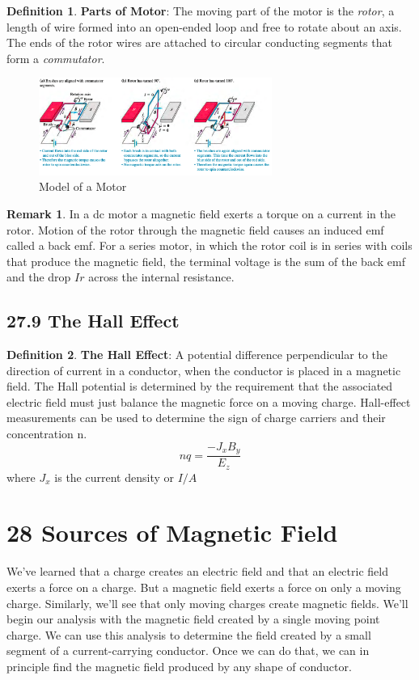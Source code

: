 \documentclass[12pt]{amsart}
\theoremstyle{definition}
\newtheorem{definition}{Definition} %
\newtheorem*{remark}{Remark}        %
\numberwithin{equation}{theorem}    %
\begin{document}
\begin{definition}
    \textbf{Parts of Motor}:
    The moving part of the motor is the \textit{rotor}, a length of wire formed into an open-ended loop and free to rotate about an axis. The ends of the rotor wires are attached to circular conducting segments that form a \textit{commutator}.
\end{definition}
\begin{figure}[H]
    \centering
    \includegraphics[width=3in]{Media/motor.png}
    \caption{Model of a Motor}
    \label{Model of a Motor}
\end{figure}
\begin{remark}
    In a dc motor a magnetic field exerts a torque on a current in the rotor. Motion of the rotor through the magnetic field causes an induced emf called a back emf. For a series motor, in which the rotor coil is in series with coils that produce the magnetic field, the terminal voltage is the sum of the back emf and the drop $Ir$ across the internal resistance.
\end{remark}

\subsection*{27.9 The Hall Effect}

\begin{definition}
    \textbf{The Hall Effect}:
    A potential difference perpendicular to the direction of current in a conductor, when the conductor is placed in a magnetic field. The Hall potential is determined by the requirement that the associated electric field must just balance the magnetic force on a moving charge. Hall-effect measurements can be used to determine the sign of charge carriers and their concentration n. 
    $$nq=\frac{-J_xB_y}{E_z}$$ where $J_x$ is the current density or $I/A$
\end{definition}


\section*{28 Sources of Magnetic Field}
We’ve learned that a charge creates an electric field and that an electric field exerts a force on a charge. But a magnetic field exerts a force on only a moving charge. Similarly, we’ll see that only moving charges create magnetic fields. We’ll begin our analysis with the magnetic field created by a single moving point charge. We can use this analysis to determine the field created by a small segment of a current-carrying conductor. Once we can do that, we can in principle find the magnetic field produced by any shape of conductor.
\end{document}
